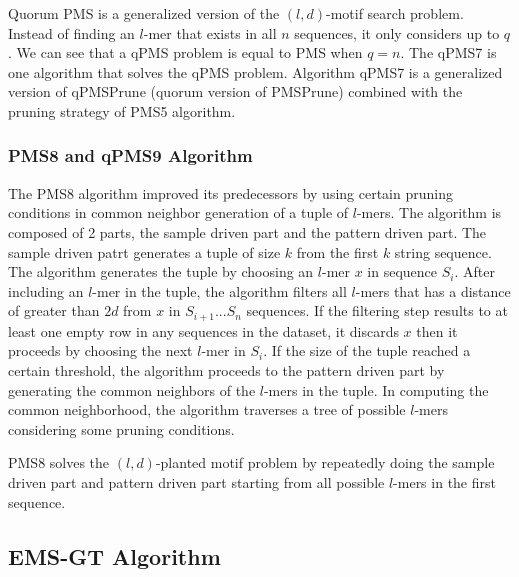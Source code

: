 Quorum PMS is a generalized version of the $(l, d)$-motif search problem. Instead of finding an $l$-mer that exists in all $n$ sequences, it only considers up to $q$. We can see that a qPMS problem is equal to PMS when $q = n$. The qPMS7 \cite{Dinh2012} is one algorithm that solves the qPMS problem. Algorithm qPMS7 is a generalized version of qPMSPrune (quorum version of PMSPrune) combined with the pruning strategy of PMS5 algorithm. 


\subsubsection{PMS8 and qPMS9 Algorithm}

The PMS8 \cite{pms2014} algorithm improved its predecessors by using certain pruning conditions in common neighbor generation of a tuple of $l$-mers. The algorithm is composed of 2 parts, the sample driven part and the pattern driven part. The sample driven patrt generates a tuple of size $k$ from the first $k$ string sequence. The algorithm generates the tuple by choosing an $l$-mer $x$ in sequence $S_i$. After including an $l$-mer in the tuple, the algorithm filters all $l$-mers that has a distance of greater than $2d$ from $x$ in $S_{i+1} ... S_n$ sequences. If the filtering step results to at least one empty row in any sequences in the dataset, it discards $x$ then it proceeds by choosing the next $l$-mer in $S_i$.
If the size of the tuple reached a certain threshold, the algorithm proceeds to the pattern driven part by generating the common neighbors of the $l$-mers in the tuple. In computing the common neighborhood, the algorithm traverses a tree of possible $l$-mers considering some pruning conditions.


PMS8 solves the $(l, d)$-planted motif problem by repeatedly doing the sample driven part and pattern driven part starting from all possible $l$-mers in the first sequence.


\subsection{EMS-GT Algorithm}



